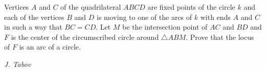 Vertices $A$ and $C$ of the quadrilateral $ABCD$ are fixed points of the circle $k$ and each of the vertices $B$ and $D$ is moving to one of the arcs of $k$ with ends $A$ and $C$ in such a way that $BC=CD$. Let $M$ be the intersection point of $AC$ and $BD$ and $F$ is the center of the circumscribed circle around $\triangle ABM$. Prove that the locus of $F$ is an arc of a circle.

\textit{J. Tabov}